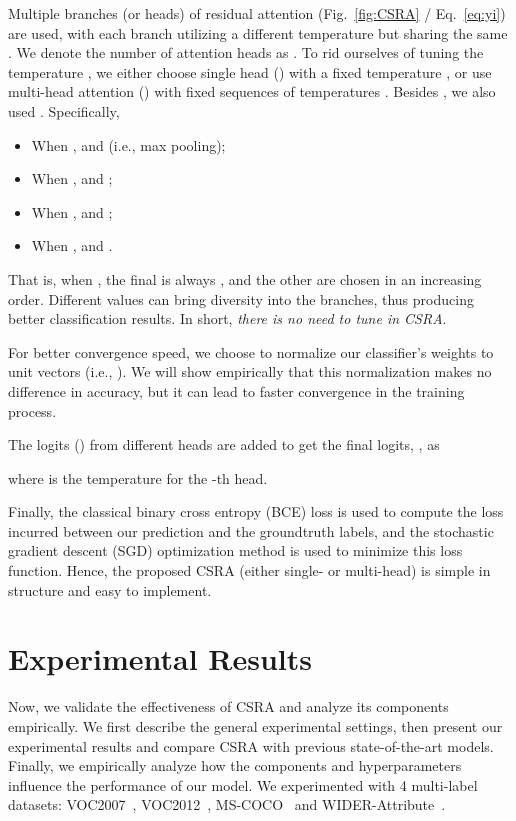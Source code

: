 \documentclass[10pt,twocolumn,letterpaper]{article}
\begin{document}
Multiple branches (or heads) of residual attention (Fig.~\ref{fig:CSRA} / Eq.~\ref{eq:yi}) are used, with each branch utilizing a different temperature  but sharing the same . We denote the number of attention heads as . To rid ourselves of tuning the temperature , we either choose single head () with a fixed temperature , or use multi-head attention () with fixed sequences of temperatures . Besides , we also used . Specifically, 
\begin{itemize}
\item When ,  and  (i.e., max pooling); 
	\item When ,  and ; 
	\item When ,  and ; 
	\item When ,  and . 
\end{itemize}
That is, when , the final  is always , and the other  are chosen in an increasing order. Different  values can bring diversity into the branches, thus producing better classification results. In short, \emph{there is no need to tune  in CSRA}.

For better convergence speed, we choose to normalize our classifier's weights to unit vectors (i.e., ). We will show empirically that this normalization makes no difference in accuracy, but it can lead to faster convergence in the training process.

The logits  () from different heads are added to get the final logits,  , as

where  is the temperature for the -th head.

Finally, the classical binary cross entropy (BCE) loss is used to compute the loss incurred between our prediction  and the groundtruth labels, and the stochastic gradient descent (SGD) optimization method is used to minimize this loss function. Hence, the proposed CSRA (either single- or multi-head) is simple in structure and easy to implement.

\section{Experimental Results}

Now, we validate the effectiveness of CSRA and analyze its components empirically. We first describe the general experimental settings, then present our experimental results and compare CSRA with previous state-of-the-art models. Finally, we empirically analyze how the components and hyperparameters influence the performance of our model. We experimented with 4 multi-label datasets: VOC2007~\cite{VOC}, VOC2012~\cite{VOC2012}, MS-COCO~\cite{MSCOCO} and WIDER-Attribute~\cite{Wider}.
\end{document}
